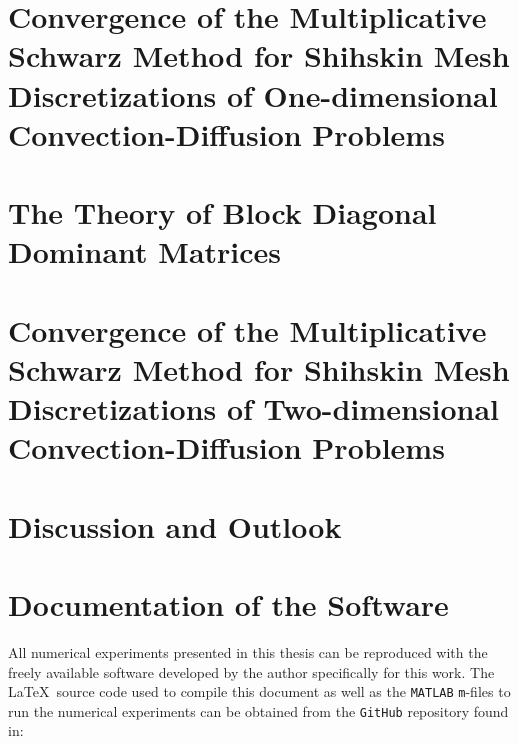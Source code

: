 \documentclass[
  twoside,
  BCOR=12mm,
  openany,
]{scrbook} %
\begin{document}
\chapter{Convergence of the Multiplicative Schwarz Method for Shihskin Mesh Discretizations of One-dimensional Convection-Diffusion Problems}
\label{ch:1D}


\chapter{The Theory of Block Diagonal Dominant Matrices}
\label{ch:BDiDo}



\chapter{Convergence of the Multiplicative Schwarz Method for Shihskin Mesh Discretizations of Two-dimensional Convection-Diffusion Problems}
\label{ch:2D}


\chapter{Discussion and Outlook}
\label{ch:end}


\ifnum{}
\appendix

% 

\chapter{Documentation of the Software}
\label{ch:matlab}
All numerical experiments presented in this thesis
can be reproduced with the freely available software developed by the author specifically for this work. The \LaTeX~source code used to compile this document as well as the \texttt{MATLAB} \texttt{m}-files to run the numerical experiments can be obtained from the \texttt{GitHub} repository found in:
\end{document}
